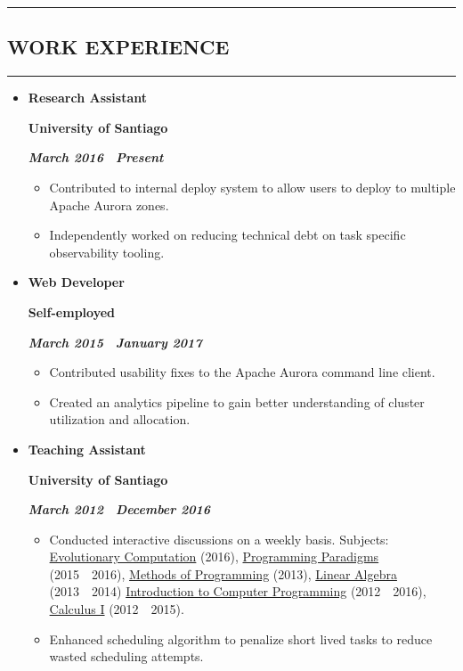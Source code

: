 \documentclass[10pt,letterpaper]{article}
\newcommand{\textbox}[1]{
  \parbox{.333\textwidth}{#1}
}
\newcommand{\sectionTitle}[1]{
  \hrule
  \vspace{-1.0em} 
  \subsection*{\uppercase{\textbf{#1}}}
  \vspace{-0.3em}
    \hrule
}
\newcommand{\titleExperienceWithoutLocation}[4]{
  \vspace{1.0em}
  
  \item[]
  {
    \textbox{\textbf{#1}\hfill}\textbox{\hfil \textbf{#2}\hfil}\hfill \textbf{\emph{#3 \textendash \ #4}}
  }
}
\begin{document}
  \sectionTitle{Work Experience}
  \begin{itemize}[leftmargin=*]
    \parskip=-0.6em
    \titleExperienceWithoutLocation{Research Assistant}{University of Santiago}{March 2016}{Present}
      \begin{itemize}[label=\textbullet]
        \itemsep0em
        \item Contributed to internal deploy system to allow users to deploy to multiple Apache Aurora zones.
        \item Independently worked on reducing technical debt on task specific observability tooling.
      \end{itemize}

    \titleExperienceWithoutLocation{Web Developer}{Self-employed}{March 2015}{January 2017}
      \begin{itemize}[label=\textbullet]
        \itemsep0em
        \item Contributed usability fixes to the Apache Aurora command line client.
        \item Created an analytics pipeline to gain better understanding of cluster utilization and allocation.
      \end{itemize}
    
    \titleExperienceWithoutLocation{Teaching Assistant}{University of Santiago}{March 2012}{December 2016}
      \begin{itemize}[label=\textbullet]
        \itemsep0em
        \item Conducted interactive discussions on a weekly basis. Subjects: \ul{Evolutionary Computation} (2016), \ul{Programming Paradigms} (2015\ \textendash \ 2016), \ul{Methods of Programming} (2013), \ul{Linear Algebra} (2013\ \textendash \ 2014) \ul{Introduction to Computer Programming} (2012\ \textendash \ 2016), \ul{Calculus I} (2012\ \textendash \ 2015).
        \item Enhanced scheduling algorithm to penalize short lived tasks to reduce wasted scheduling attempts.
      \end{itemize}
    
  \end{itemize}
  
\end{document}

